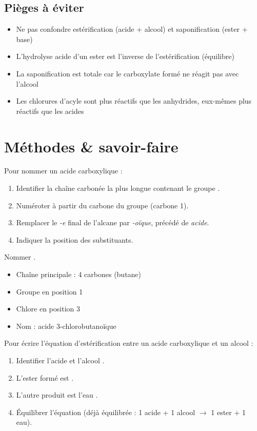 \begin{synthese}
\subsection*{Pièges à éviter}
\begin{itemize}
    \item Ne pas confondre estérification (acide + alcool) et saponification (ester + base)
    \item L'hydrolyse acide d'un ester est l'inverse de l'estérification (équilibre)
    \item La saponification est totale car le carboxylate formé ne réagit pas avec l'alcool
    \item Les chlorures d'acyle sont plus réactifs que les anhydrides, eux-mêmes plus réactifs que les acides
\end{itemize}
\end{synthese}

\section{Méthodes \& savoir-faire}

Pour nommer un acide carboxylique :
\begin{enumerate}
    \item Identifier la chaîne carbonée la plus longue contenant le groupe .
    \item Numéroter à partir du carbone du groupe  (carbone 1).
    \item Remplacer le \textit{-e} final de l'alcane par \textit{-oïque}, précédé de \textit{acide}.
    \item Indiquer la position des substituants.
\end{enumerate}

\begin{exemple}
Nommer .
\begin{itemize}
    \item Chaîne principale : 4 carbones (butane)
    \item Groupe  en position 1
    \item Chlore en position 3
    \item Nom : acide 3-chlorobutanoïque
\end{itemize}
\end{exemple}

Pour écrire l'équation d'estérification entre un acide carboxylique et un alcool :
\begin{enumerate}
    \item Identifier l'acide  et l'alcool .
    \item L'ester formé est .
    \item L'autre produit est l'eau .
    \item Équilibrer l'équation (déjà équilibrée : 1 acide + 1 alcool $\rightarrow$ 1 ester + 1 eau).
\end{enumerate}

